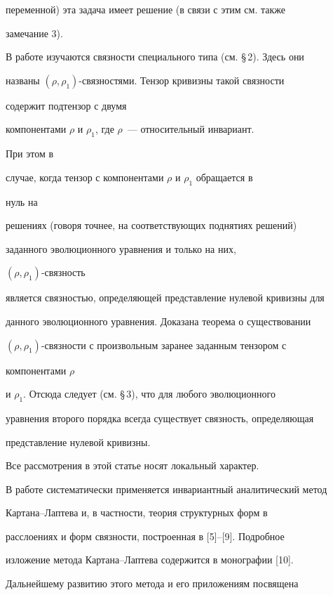 переменной) эта задача имеет решение (в связи с этим см. также 


замечание 3). 


 


В работе изучаются связности специального типа (см. \S\,2). Здесь они 


названы $(\rho,\rho_1)$-связ\-ностями. Тензор кривизны такой связности


содержит подтензор с двумя 


компонентами $\rho$ и $\rho_1$, где $\rho$~--- относительный инвариант. 


При этом в 


случае, когда тензор с компонентами $\rho$ и $\rho_1$ обращается в 


нуль на 


решениях (говоря точнее, на соответствующих поднятиях решений) 


заданного эволюционного уравнения и только на них, 


$(\rho,\rho_1)$-связность 


является связностью, определяющей представление нулевой кривизны для 


данного эволюционного уравнения. Доказана теорема о существовании 


$(\rho,\rho_1)$-связности с произвольным заранее заданным тензором с 


компонентами $\rho$ 


и $\rho_1$. Отсюда следует (см. \S\,3), что для любого эволюционного 


уравнения второго порядка всегда существует связность, определяющая 


представление нулевой кривизны. 


 


Все рассмотрения в этой статье носят локальный характер. 


 


В работе систематически применяется инвариантный аналитический метод 


Картана--Лаптева и, в частности, теория структурных форм в 


расслоениях и форм связности, построенная в [5]--[9]. Подробное 


изложение метода Картана--Лаптева содержится в монографии [10]. 


Дальнейшему развитию этого метода и его приложениям посвящена 



